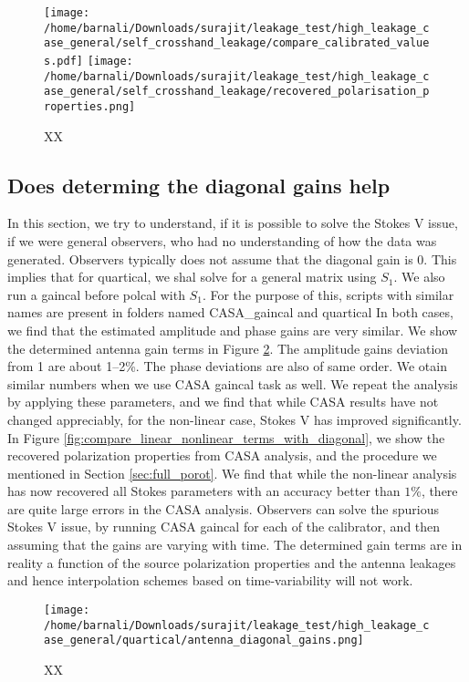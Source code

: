 \documentclass{article}
\begin{document}
\begin{figure}
\centering
\texttt{[image: /home/barnali/Downloads/surajit/leakage\_test/high\_leakage\_case\_general/self\_crosshand\_leakage/compare\_calibrated\_values.pdf]}
\texttt{[image: /home/barnali/Downloads/surajit/leakage\_test/high\_leakage\_case\_general/self\_crosshand\_leakage/recovered\_polarisation\_properties.png]}
\caption{XX}
\label{fig:compare_input_output_source_params_self_crosshand_high_leak_general}
\end{figure}

\subsection{Does determing the diagonal gains help}

In this section, we try to understand, if it is possible to solve the Stokes V issue, if we were general observers, who had no understanding of how the data was generated. Observers typically does not assume that the diagonal gain is 0. This implies that for quartical, we shal solve for a general matrix using $S_1$. We also run a gaincal before polcal with $S_1$. For the purpose of this, scripts with similar names are present in folders named CASA\_gaincal and quartical In both cases, we find that the estimated amplitude and phase gains are very similar. We show the determined antenna gain terms in Figure \ref{fig:quartical_ant_gains}. The amplitude gains deviation from 1 are about 1--2\%. The phase deviations are also of same order. We otain similar numbers when we use CASA gaincal task as well. We repeat the analysis by applying these parameters, and we find that while CASA results have not changed appreciably, for the non-linear case, Stokes V has improved significantly. In Figure \ref{fig:compare_linear_nonlinear_terms_with_diagonal}, we show the recovered polarization properties from CASA analysis, and the procedure we mentioned in Section \ref{sec:full_porot}. We find that while the non-linear analysis has now recovered all Stokes parameters with an accuracy better than $1\%$, there are quite large errors in the CASA analysis. Observers can solve the spurious Stokes V issue, by running CASA gaincal for each of the calibrator, and then assuming that the gains are varying with time. The determined gain terms are in reality a function of the source polarization properties and the antenna leakages and hence interpolation schemes based on time-variability will not work. 
 
\begin{figure}
\centering
\texttt{[image: /home/barnali/Downloads/surajit/leakage\_test/high\_leakage\_case\_general/quartical/antenna\_diagonal\_gains.png]}
\caption{XX}
\label{fig:quartical_ant_gains}
\end{figure}
\end{document}
